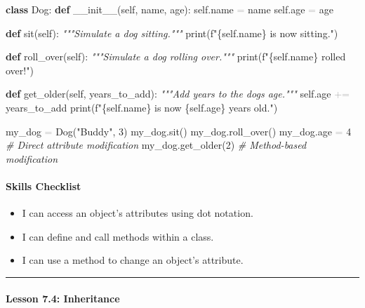 \documentclass[
  justified,
  openright,
]{tufte-book}
\let\subsection\paragraph
\let\paragraph\paragraph
\newcommand{\KeywordTok}[1]{\textcolor{CodeKeyword}{\textbf{#1}}}  %
\newcommand{\StringTok}[1]{\textcolor{CodeString}{#1}}              %
\newcommand{\CommentTok}[1]{\textcolor{CodeComment}{\textit{#1}}}  %
\newcommand{\CodeNumTok}[1]{\textcolor{CodeNumber}{#1}}             %
\newcommand{\CodeFuncTok}[1]{\textcolor{CodeKeyword}{#1}}           %
\newcommand{\OperatorTok}[1]{\textcolor{DarkGray}{#1}}              %
\newenvironment{Shaded}{%
  \begin{mdframed}[style=TufteCode]%
}{%
  \end{mdframed}%
}
\let\subsection\paragraph
\let\paragraph\paragraph
\providecommand{\tightlist}{%
  \setlength{\itemsep}{0pt}\setlength{\parskip}{0pt}}
\begin{document}
\begin{Shaded}
\begin{Highlighting}[]
\KeywordTok{class} Dog:
    \KeywordTok{def} \CodeFuncTok{\_\_init\_\_}(self, name, age):
        self.name \OperatorTok{=} name
        self.age \OperatorTok{=} age
 
    \KeywordTok{def} sit(self):
        \CommentTok{"""Simulate a dog sitting."""}
        print(\StringTok{f"}\StringTok{\{}self\StringTok{.}name\StringTok{\}}\StringTok{ is now sitting."})
 
    \KeywordTok{def} roll\_over(self):
        \CommentTok{"""Simulate a dog rolling over."""}
        print(\StringTok{f"}\StringTok{\{}self\StringTok{.}name\StringTok{\}}\StringTok{ rolled over!"})
 
    \KeywordTok{def} get\_older(self, years\_to\_add):
        \CommentTok{"""Add years to the dog\textquotesingle{}s age."""}
        self.age \OperatorTok{+=} years\_to\_add
        print(\StringTok{f"}\StringTok{\{}self\StringTok{.}name\StringTok{\}}\StringTok{ is now }\StringTok{\{}self\StringTok{.}age\StringTok{\}}\StringTok{ years old."})
 
my\_dog \OperatorTok{=} Dog(\StringTok{"Buddy"}, \CodeNumTok{3})
my\_dog.sit()
my\_dog.roll\_over()
my\_dog.age \OperatorTok{=} \CodeNumTok{4}          \CommentTok{\# Direct attribute modification}
my\_dog.get\_older(\CodeNumTok{2})     \CommentTok{\# Method{-}based modification}
\end{Highlighting}
\end{Shaded}

\subsection{Skills Checklist}\label{skills-checklist-34}

\begin{itemize}
\tightlist
\item[$\square$]
  I can access an object's attributes using dot notation.
\item[$\square$]
  I can define and call methods within a class.
\item[$\square$]
  I can use a method to change an object's attribute.
\end{itemize}

\begin{center}\rule{0.5\linewidth}{0.5pt}\end{center}

\subsection{Lesson 7.4: Inheritance}\label{lesson-7.4-inheritance}
\end{document}
